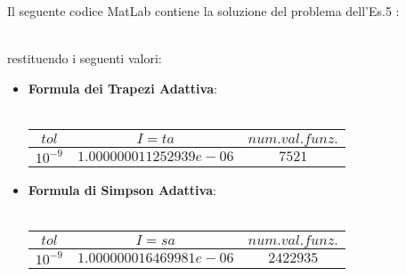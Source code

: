 Il seguente codice MatLab contiene la soluzione del problema dell'Es.5 :\\\
	
restituendo i seguenti valori:
\begin{itemize}
	\item
		\textbf{Formula dei Trapezi Adattiva}:\\\
		\begin{center}
		\begin{tabular}{|c|c|c|}
			\hline
				$tol$ & $I=ta$ & $num. val. funz.$ \\
    			\hline
    				$10^{-9}$ & $1.000000011252939e-06$ & $7521$ \\
				\hline
		\end{tabular}
		\end{center}
	\item
		\textbf{Formula di Simpson Adattiva}:\\\
				\begin{center}
		\begin{tabular}{|c|c|c|}
			\hline
				$tol$ & $I=sa$ & $num. val. funz.$ \\
    			\hline
    				$10^{-9}$ & $1.000000016469981e-06$ & $2422935$ \\
				\hline
		\end{tabular}
		\end{center}
\end{itemize}
